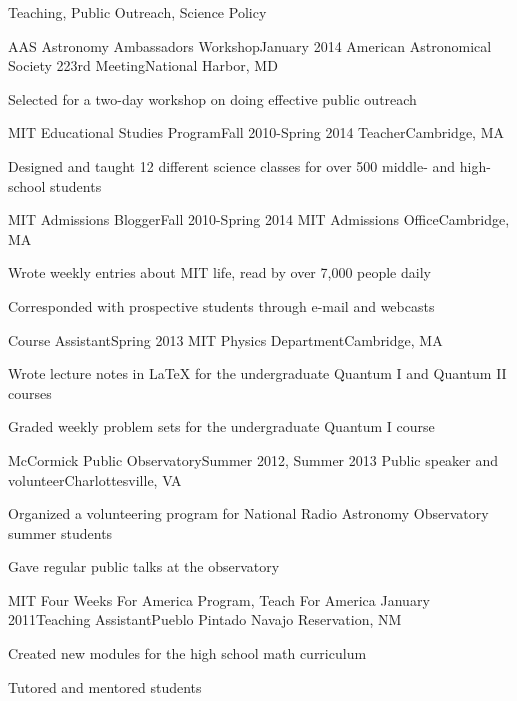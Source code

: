 \documentclass{resume} %
\begin{document}
\begin{rSection}{Teaching, Public Outreach, Science Policy}
\begin{rSubsection}{AAS Astronomy Ambassadors Workshop}{January 2014}
  {American Astronomical Society 223rd Meeting}{National Harbor, MD}
\item Selected for a two-day workshop on doing effective public outreach 
\end{rSubsection}

\begin{rSubsection}{MIT Educational Studies Program}{Fall 2010-Spring 2014}
  {Teacher}{Cambridge, MA}
\item Designed and taught 12 different science classes for over 500 middle- 
  and high-school students
\end{rSubsection}

\begin{rSubsection}{MIT Admissions Blogger}{Fall 2010-Spring 2014}
  {MIT Admissions Office}{Cambridge, MA}
\item Wrote weekly entries about MIT life, read by over 7,000 people daily
\item Corresponded with prospective students through e-mail and webcasts
\end{rSubsection}

\begin{rSubsection}{Course Assistant}{Spring 2013}
  {MIT Physics Department}{Cambridge, MA}
\item Wrote lecture notes in LaTeX for the undergraduate Quantum I 
  and Quantum II courses
\item Graded weekly problem sets for the undergraduate Quantum I course
\end{rSubsection}

\begin{rSubsection}{McCormick Public Observatory}{Summer 2012, Summer 2013}
  {Public speaker and volunteer}{Charlottesville, VA}
\item Organized a volunteering program for National Radio Astronomy Observatory 
  summer students
\item Gave regular public talks at the observatory
\end{rSubsection}

\begin{rSubsection}{MIT Four Weeks For America Program, Teach For America}
  {January 2011}{Teaching Assistant}{Pueblo Pintado Navajo Reservation, NM}
\item Created new modules for the high school math curriculum
\item Tutored and mentored students
\end{rSubsection}

\end{rSection}
\end{document}
